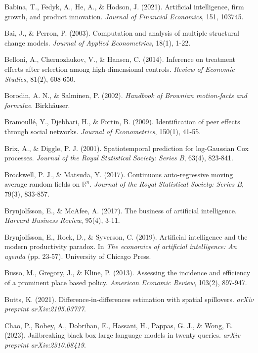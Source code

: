 \begin{thebibliography}{99}
Babina, T., Fedyk, A., He, A., \& Hodson, J. (2021). Artificial intelligence, firm growth, and product innovation. \textit{Journal of Financial Economics}, 151, 103745.

Bai, J., \& Perron, P. (2003). Computation and analysis of multiple structural change models. \textit{Journal of Applied Econometrics}, 18(1), 1-22.

Belloni, A., Chernozhukov, V., \& Hansen, C. (2014). Inference on treatment effects after selection among high-dimensional controls. \textit{Review of Economic Studies}, 81(2), 608-650.

Borodin, A. N., \& Salminen, P. (2002). \textit{Handbook of Brownian motion-facts and formulae}. Birkhäuser.

Bramoullé, Y., Djebbari, H., \& Fortin, B. (2009). Identification of peer effects through social networks. \textit{Journal of Econometrics}, 150(1), 41-55.

Brix, A., \& Diggle, P. J. (2001). Spatiotemporal prediction for log-Gaussian Cox processes. \textit{Journal of the Royal Statistical Society: Series B}, 63(4), 823-841.

Brockwell, P. J., \& Matsuda, Y. (2017). Continuous auto-regressive moving average random fields on $\mathbb{R}^n$. \textit{Journal of the Royal Statistical Society: Series B}, 79(3), 833-857.

Brynjolfsson, E., \& McAfee, A. (2017). The business of artificial intelligence. \textit{Harvard Business Review}, 95(4), 3-11.

Brynjolfsson, E., Rock, D., \& Syverson, C. (2019). Artificial intelligence and the modern productivity paradox. In \textit{The economics of artificial intelligence: An agenda} (pp. 23-57). University of Chicago Press.

Busso, M., Gregory, J., \& Kline, P. (2013). Assessing the incidence and efficiency of a prominent place based policy. \textit{American Economic Review}, 103(2), 897-947.

Butts, K. (2021). Difference-in-differences estimation with spatial spillovers. \textit{arXiv preprint arXiv:2105.03737}.

Chao, P., Robey, A., Dobriban, E., Hassani, H., Pappas, G. J., \& Wong, E. (2023). Jailbreaking black box large language models in twenty queries. \textit{arXiv preprint arXiv:2310.08419}.


\end{thebibliography}
